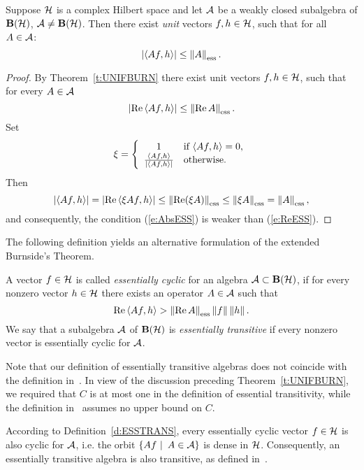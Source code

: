 \begin{cor}\label{c:UNIFBURN}
Suppose ${\cal H}$ is a complex Hilbert space and let ${\cal A}$ be a weakly closed
subalgebra of $\mathbf B(\cal H)$, ${\cal A}\neq\mathbf B(\cal H)$. Then there exist {\em unit} vectors
$f,h\in{\cal H}$, such that for all $A\in{\cal A}$:
\begin{equation}\label{e:AbsESS}
  \abs{\seq{A f,h}}\leq\essnorm{A}.
\end{equation}
\end{cor}

\begin{proof}
By Theorem~\ref{t:UNIFBURN} there exist unit vectors $f,h\in{\cal H}$, such that
for every $A\in{\cal A}$
\[ \abs{\RE{\seq{A f,h}}}\leq\essnorm{\RE{A}}. \]
Set
\[ \xi = \left\lbrace
           \begin{array}{c l}
             1 & \text{if $\left<A{}f,h\right>=0$},\\
             \tfrac{\left<A{}f,h\right>}{\left\vert\left<A{}f,h\right>\right\vert} & \text{otherwise}.
           \end{array}
         \right. \]
Then
\[ \abs{\seq{A f,h}} = \abs{\RE\seq{\xi A f,h}} \leq \essnorm{\RE(\xi A)}
   \leq \essnorm{\xi A} = \essnorm{A}, \]
and consequently, the condition (\ref{e:AbsESS}) is weaker than
(\ref{e:ReESS}).
\end{proof}

\smallskip

The following definition yields an alternative formulation of the extended
Burnside's Theorem.

\begin{defn}\label{d:ESSTRANS}
A vector $f\in{\cal H}$ is called {\em essentially cyclic} for an algebra
${\cal A}\subset\mathbf B(\cal H)$, if for every nonzero vector $h\in{\cal H}$ there exists an operator
$A\in{\cal A}$ such that
\begin{equation*}
  \RE{\seq{A f,h}} > \essnorm{\RE{A}}\norm{f}\norm{h}.
\end{equation*}
We say that a subalgebra ${\cal A}$ of $\mathbf B(\cal H)$ is {\em essentially transitive} if
every nonzero vector is essentially cyclic for ${\cal A}$.
\end{defn}

\begin{rem}
Note that our definition of essentially transitive algebras does not coincide
with the definition in~\cite{Lom91}. In view of the discussion preceding
Theorem~\ref{t:UNIFBURN}, we required that $C$ is at most one in the
definition of essential transitivity, while the definition in~\cite{Lom91}
assumes no upper bound on $C$.

\smallskip

According to Definition~\ref{d:ESSTRANS}, every essentially cyclic vector
$f\in{\cal H}$ is also cyclic for ${\cal A}$, i.e. the orbit
$\left\{A{f}\,\,|\,\,\,A\in{\cal A}\right\}$ is dense in ${\cal H}$. Consequently, an essentially
transitive algebra is also transitive, as defined in~\cite{RR73}.
\end{rem}

